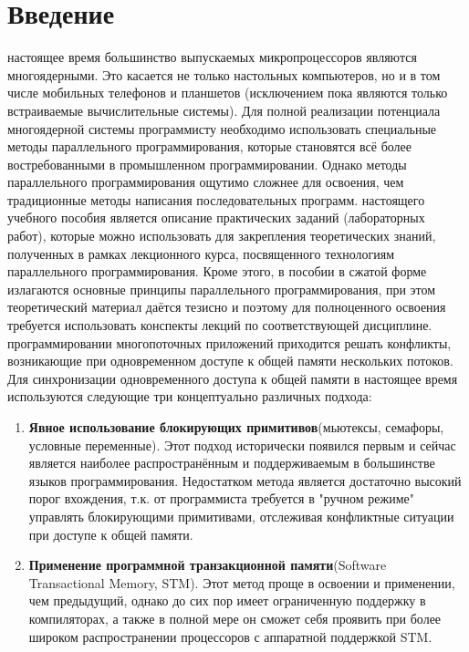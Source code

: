 { %
	\section*{Введение}
	 настоящее время большинство выпускаемых микропроцессоров являются многоядерными. Это касается не только настольных компьютеров, но и в том числе мобильных телефонов и планшетов (исключением пока являются только встраиваемые вычислительные системы). Для полной реализации потенциала многоядерной системы программисту необходимо использовать специальные методы параллельного программирования, которые становятся всё более востребованными в промышленном программировании. Однако методы параллельного программирования ощутимо сложнее для освоения, чем традиционные методы написания последовательных программ.
	 настоящего учебного пособия является описание практических заданий (лабораторных работ), которые можно использовать для закрепления теоретических знаний, полученных в рамках лекционного курса, посвященного технологиям параллельного программирования. Кроме этого, в пособии в сжатой форме излагаются основные принципы параллельного программирования, при этом теоретический материал даётся тезисно и поэтому для полноценного освоения требуется использовать конспекты лекций по соответствующей дисциплине.
	 программировании многопоточных приложений приходится решать конфликты, возникающие при одновременном доступе к общей памяти нескольких потоков. Для синхронизации одновременного доступа к общей памяти в настоящее время используются следующие три концептуально различных подхода:
	\begin{enumerate}
		\item\textbf{Явное использование блокирующих примитивов}\quad(мьютексы, семафоры, условные переменные). Этот подход исторически появился первым и сейчас является наиболее распространённым и поддерживаемым в большинстве языков программирования. Недостатком метода является достаточно высокий порог вхождения, т.к. от программиста требуется в "ручном режиме" управлять блокирующими примитивами, отслеживая конфликтные ситуации при доступе к общей памяти.
		\item\textbf{Применение программной транзакционной памяти}\quad(Software\\ Transactional Memory, STM). Этот метод проще в освоении и применении, чем предыдущий, однако до сих пор имеет ограниченную поддержку в компиляторах, а также в полной мере он сможет себя проявить при более широком распространении процессоров с аппаратной поддержкой STM.

\end{enumerate}}
